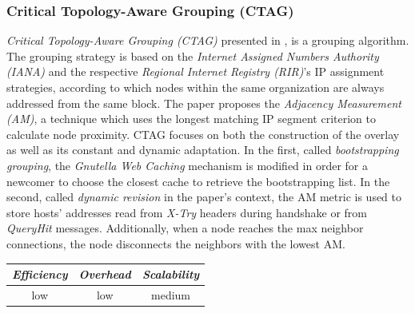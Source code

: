 \subsubsection{Critical Topology-Aware Grouping (CTAG)}
\emph{Critical Topology-Aware Grouping (CTAG)} presented in \cite{ZL2006}, is a
grouping algorithm. The grouping strategy is based on the \emph{Internet
Assigned Numbers Authority (IANA)} and the respective \emph{Regional Internet
Registry (RIR)}'s IP assignment strategies, according to which nodes within the
same organization are always addressed from the same block. The paper proposes
the \emph{Adjacency Measurement (AM)}, a technique which uses the longest
matching IP segment criterion to calculate node proximity. CTAG focuses on both
the construction of the overlay as well as its constant and dynamic adaptation.
In the first, called \emph{bootstrapping grouping}, the \emph{Gnutella Web
Caching} mechanism is modified in order for a newcomer to choose the closest
cache to retrieve the bootstrapping list. In the second, called \emph{dynamic
revision} in the paper's context, the AM metric is used to store hosts'
addresses read from \emph{X-Try} headers during handshake or from
\emph{QueryHit} messages. Additionally, when a node reaches the max neighbor
connections, the node disconnects the neighbors with the lowest AM.

\begin{center}
\begin{tabular}{ccc}
\emph{Efficiency} & \emph{Overhead} & \emph{Scalability} \\
\hline
low &
low &
medium
\end{tabular}
\end{center}



